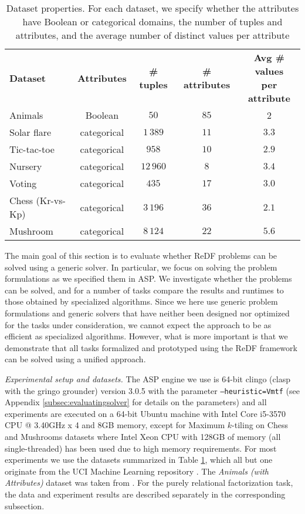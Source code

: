 
\begin{table}[b]
 \caption{Dataset properties. For each dataset,  we specify whether the attributes have Boolean or categorical domains, the number of tuples and attributes, and the average number of distinct values per attribute}
 \label{table:dataset_description}
\begin{tabular}{lcccc}
  \textbf{Dataset} & \textbf{Attributes} & \textbf{\# tuples} & \textbf{\# attributes} &   \makecell{ \textbf{Avg \# values} \\ \textbf{per attribute}}  \\
Animals          & Boolean         &  $50$  &  $85$  &  2  \\
Solar flare      & categorical &  $1\,389$  &  $11$  &  $3.3$  \\
Tic-tac-toe      & categorical  &  $958$  &  $10$  &  $2.9$  \\
Nursery          & categorical &  $12\,960$  & $8$  &  $3.4$  \\
Voting           & categorical &  $435$  &  $17$  &  $3.0$  \\
Chess (Kr-vs-Kp) & categorical &  $3\,196$  &  $36$  &  $2.1$  \\ 
Mushroom         & categorical &  $8\,124$  &  $22$  &  $5.6$
\end{tabular}
\end{table}

The main goal of this section is to evaluate whether ReDF problems can be solved using a generic solver. In particular, we focus on solving the problem formulations as we specified them in ASP. We investigate whether the problems can be solved, and for a number of tasks compare the results and runtimes to those obtained by specialized algorithms. Since we here use generic problem formulations and generic solvers that have neither been designed nor optimized for the tasks under consideration, we cannot expect the approach to be as efficient as specialized algorithms. However, what is more important is that we demonstrate that all tasks formalized and prototyped using the ReDF framework can be solved using a unified approach.


\textit{Experimental setup and datasets.} The ASP engine we use is 64-bit clingo (clasp with the gringo grounder) version 3.0.5 with the parameter \texttt{--heuristic=Vmtf} (see Appendix \ref{subsec:evaluatingsolver} for details on the parameters) and all experiments are executed on a 64-bit Ubuntu machine with Intel Core i5-3570 CPU @ 3.40GHz x 4 and 8GB memory, except for Maximum $k$-tiling on Chess and Mushrooms datasets where Intel Xeon CPU with 128GB of memory (all single-threaded) has been used due to high memory requirements. For most experiments we use the datasets summarized in Table \ref{table:dataset_description}, which all but one originate from the UCI Machine Learning repository \parencite{ucidatasets}. The \emph{Animals (with Attributes)} dataset was taken from \cite{animalDataset}. For the purely relational factorization task, the data and experiment results are described separately in the corresponding subsection. 


